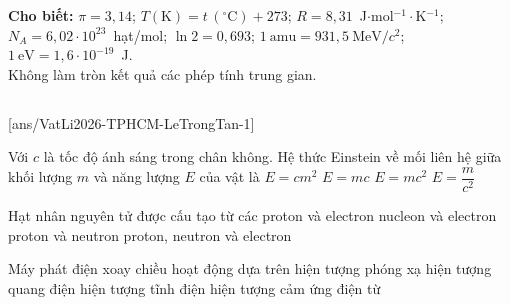 \def\CheDo{solcolor}%
\def\tenchuong{THPT Lê Trọng Tấn, TP HCM}
\def\thuonghieu{VẬT LÍ 12 -- Eduzy.com.vn}
\def\TachCauDS{1}
\def\TachCauLG{1}




	\noindent\textbf{Cho biết:} $\pi=3{,}14$; $T(\text{K})=t\,(^\circ\text{C})+273$; $R=8{,}31$~J$\cdot$mol$^{-1}\cdot$K$^{-1}$; $N_A=6{,}02\cdot 10^{23}$~hạt/mol; $\ln 2=0{,}693$; $1~\text{amu}=931{,}5~\text{MeV}/c^2$; $1~\text{eV}=1{,}6\cdot 10^{-19}$~J.\\
	Không làm tròn kết quả các phép tính trung gian.

	\noindent
	\subsection*{}
	\setcounter{ex}{0}
	[ans/VatLi2026-TPHCM-LeTrongTan-1]

	\begin{ex}%
		Với $c$ là tốc độ ánh sáng trong chân không. Hệ thức Einstein về mối liên hệ giữa khối lượng $m$ và năng lượng $E$ của vật là
		\choice
		{$E=cm^2$}
		{$E=mc$}
		{\True $E=mc^2$}
		{$E=\dfrac{m}{c^2}$}
	\end{ex}

	\begin{ex}%
		Hạt nhân nguyên tử được cấu tạo từ các
		\choice
		{proton và electron}
		{nucleon và electron}
		{\True proton và neutron}
		{proton, neutron và electron}
	\end{ex}

	\begin{ex}%
		Máy phát điện xoay chiều hoạt động dựa trên
		\choice
		{hiện tượng phóng xạ}
		{hiện tượng quang điện}
		{hiện tượng tĩnh điện}
		{\True hiện tượng cảm ứng điện từ}
	\end{ex}

